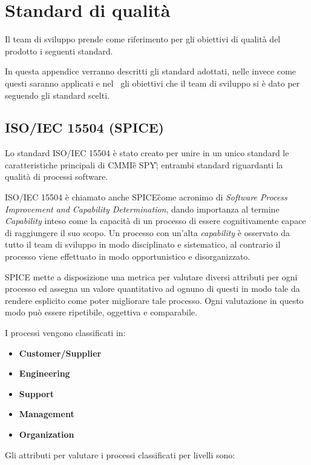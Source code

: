 \newpage
\section{Standard di qualità}
Il team di sviluppo prende come riferimento per gli obiettivi di qualità del prodotto i seguenti standard.

In questa appendice verranno descritti gli standard adottati, nelle \NdP\D invece come questi saranno applicati e nel \PdQ~gli obiettivi che il team di sviluppo si è dato per seguendo gli standard scelti.

\subsection{ISO/IEC 15504 (SPICE)}
Lo standard ISO/IEC 15504 è stato creato per unire in un unico standard le caratteristiche principali di CMMI\G e SPY\G; entrambi standard riguardanti la qualità di processi software.

ISO/IEC 15504 è chiamato anche SPICE\G come acronimo di \textit{Software Process Improvement and Capability Determination}, dando importanza al termine \textit{Capability} inteso come la capacità di un processo di essere cognitivamente capace di raggiungere il suo scopo. Un processo con un'alta \textit{capability} è osservato da tutto il team di sviluppo in modo disciplinato e sistematico, al contrario il processo viene effettuato in modo opportunistico e disorganizzato.

SPICE mette a disposizione una metrica per valutare diversi attributi per ogni processo ed assegna un valore quantitativo ad ognuno di questi in modo tale da rendere esplicito come poter migliorare tale processo. Ogni valutazione in questo modo può essere ripetibile, oggettiva e comparabile.

I processi vengono classificati in:

\begin{itemize}
	\item \textbf{Customer/Supplier}
	\item \textbf{Engineering}
	\item \textbf{Support}
	\item \textbf{Management}
	\item \textbf{Organization}
\end{itemize}

Gli attributi per valutare i processi classificati per livelli sono:

